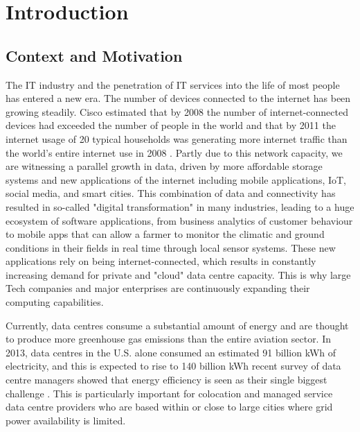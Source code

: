 \chapter{Introduction}
\label{chapter:introduction}

\section{Context and Motivation}

The IT industry and the penetration of IT services into the life of most people has entered a new era. The number of devices connected to the internet has been growing steadily.  Cisco estimated that by 2008 the number of internet-connected devices had exceeded the number of people in the world and that by 2011 the internet usage of 20 typical households was generating more internet traffic than the world's entire  internet use in 2008 \cite{evans2008-iotinfo}. Partly due to this network capacity, we are witnessing a parallel growth in data, driven by more affordable storage systems and  new applications of the internet including mobile applications, IoT, social media, and smart cities.  This combination of data and connectivity has resulted in so-called "digital transformation" in many industries, leading to a huge ecosystem of software applications, from business analytics of customer behaviour to mobile apps that can allow a farmer to monitor the climatic and ground conditions in their fields in real time through local sensor systems. These new applications rely on being internet-connected, which results in constantly increasing demand for private and "cloud" data centre capacity.  This is why large Tech companies and major enterprises are continuously expanding their computing capabilities. 

Currently, data centres consume a substantial amount of energy and are thought to produce more greenhouse gas emissions than the entire aviation sector. In 2013, data centres in the U.S. alone consumed an estimated 91 billion kWh of electricity, and this is expected to rise to 140 billion kWh recent survey of data centre managers showed that energy efficiency is seen as their single biggest challenge \cite{cainc2016-ausdcenergy}. This is particularly important for colocation and managed service data centre providers who are based within or close to large cities where grid power availability is limited.

